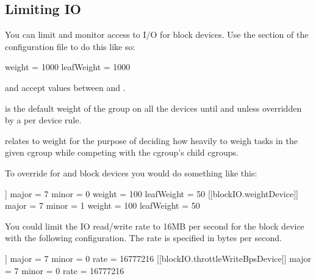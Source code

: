 \documentclass[letterpaper,10pt,english]{sphinxmanual}
\begin{document}
\subsection{Limiting IO}
\label{\detokenize{cgroups:limiting-io}}
You can limit and monitor access to I/O for block devices.  Use the
\sphinxcode{\sphinxupquote{{[}blockIO{]}}} section of the configuration file to do this like so:

%
\begin{sphinxVerbatim}[commandchars=\\\{\}]
[blockIO]
    weight = 1000
    leafWeight = 1000
\end{sphinxVerbatim}

 and  accept values between  and .

 is the default weight of the group on all the devices until and
unless overridden by a per device rule.

 relates to weight for the purpose of deciding how heavily to
weigh tasks in the given cgroup while competing with the cgroup’s child cgroups.

To override  for  and  block
devices you would do something like this:

%
\begin{sphinxVerbatim}[commandchars=\\\{\}]
[blockIO]
    [[blockIO.weightDevice]]
        major = 7
        minor = 0
        weight = 100
        leafWeight = 50
    [[blockIO.weightDevice]]
        major = 7
        minor = 1
        weight = 100
        leafWeight = 50
\end{sphinxVerbatim}

You could limit the IO read/write rate to 16MB per second for the 
block device with the following configuration.  The rate is specified in bytes
per second.

%
\begin{sphinxVerbatim}[commandchars=\\\{\}]
[blockIO]
    [[blockIO.throttleReadBpsDevice]]
        major = 7
        minor = 0
        rate = 16777216
    [[blockIO.throttleWriteBpsDevice]]
        major = 7
        minor = 0
        rate = 16777216
\end{sphinxVerbatim}
\end{document}
